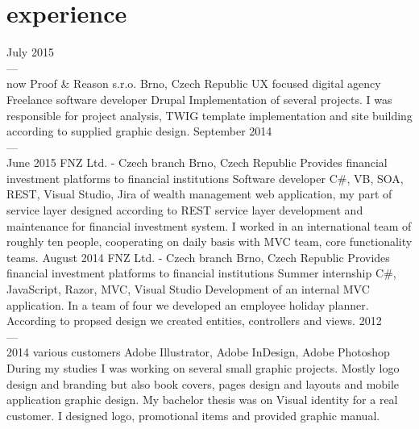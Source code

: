 \documentclass[]{friggeri-cv} %
\begin{document}
\section{experience}

\begin{entrylist}
  \job
  {July 2015 \\ --- \\ now}
  {Proof \& Reason s.r.o.}
  {Brno, Czech Republic}
  {UX focused digital agency}
  {
    \position
    {Freelance software developer}
    {Drupal}
    {Implementation of several projects.
    I was responsible for project analysis, TWIG template implementation and site building according to supplied graphic design.}
  }
\job
{September 2014 \\ --- \\ June 2015}
{FNZ Ltd. - Czech branch}
{Brno, Czech Republic}
{Provides financial investment platforms to financial institutions}
{
  \position
  {Software developer}
  {C\#, VB, SOA, REST, Visual Studio, Jira}
  {of wealth management web application, my part of service layer designed according to REST service layer development and maintenance for financial investment system.
  I worked in an international team of roughly ten people, cooperating on daily basis with MVC team, core functionality teams.
  }
}
\job
{August 2014}
{FNZ Ltd. - Czech branch}
{Brno, Czech Republic}
{Provides financial investment platforms to financial institutions}
{
  \position
  {Summer internship}
  {C\#, JavaScript, Razor, MVC, Visual Studio}
  {Development of an internal MVC application.
  In a team of four we developed an employee holiday planner. According to propsed design we created entities, controllers and views.}
}
\job
{2012 \\ --- \\ 2014}
{various customers}
{}
{}
{
  {Adobe Illustrator, Adobe InDesign, Adobe Photoshop}
  {During my studies I was working on several small graphic projects. Mostly logo design and branding but also book covers, pages design and layouts and mobile application graphic design. My bachelor thesis was on Visual identity for a real customer. I designed logo, promotional items and provided graphic manual.}
}
\end{entrylist}
\end{document}
